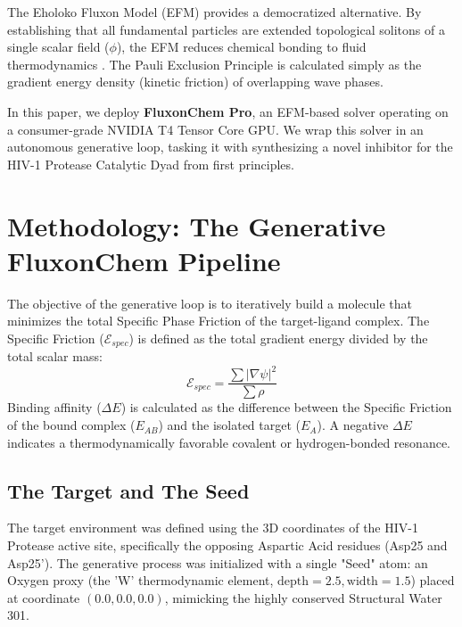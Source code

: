 \documentclass[11pt, twoside]{article}
\begin{document}
The Eholoko Fluxon Model (EFM) provides a democratized alternative. By establishing that all fundamental particles are extended topological solitons of a single scalar field ($\phi$), the EFM reduces chemical bonding to fluid thermodynamics \citep{emvula2026charge}. The Pauli Exclusion Principle is calculated simply as the gradient energy density (kinetic friction) of overlapping wave phases. 

In this paper, we deploy \textbf{FluxonChem Pro}, an EFM-based solver operating on a consumer-grade NVIDIA T4 Tensor Core GPU. We wrap this solver in an autonomous generative loop, tasking it with synthesizing a novel inhibitor for the HIV-1 Protease Catalytic Dyad from first principles.

\section{Methodology: The Generative FluxonChem Pipeline}

The objective of the generative loop is to iteratively build a molecule that minimizes the total Specific Phase Friction of the target-ligand complex. The Specific Friction ($\mathcal{E}_{spec}$) is defined as the total gradient energy divided by the total scalar mass:
\begin{equation}
    \mathcal{E}_{spec} = \frac{\sum |\nabla \psi|^2}{\sum \rho}
\end{equation}
Binding affinity ($\Delta E$) is calculated as the difference between the Specific Friction of the bound complex ($E_{AB}$) and the isolated target ($E_A$). A negative $\Delta E$ indicates a thermodynamically favorable covalent or hydrogen-bonded resonance.

\subsection{The Target and The Seed}
The target environment was defined using the 3D coordinates of the HIV-1 Protease active site, specifically the opposing Aspartic Acid residues (Asp25 and Asp25'). The generative process was initialized with a single "Seed" atom: an Oxygen proxy (the 'W' thermodynamic element, $\text{depth}=2.5, \text{width}=1.5$) placed at coordinate $(0.0, 0.0, 0.0)$, mimicking the highly conserved Structural Water 301.
\end{document}
